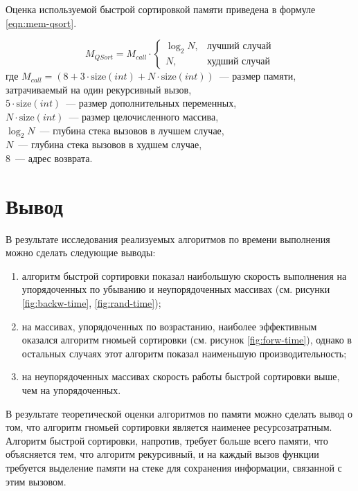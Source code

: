Оценка используемой быстрой сортировкой памяти приведена в формуле \ref{eqn:mem-qsort}.

\begin{equation}
    \label{eqn:mem-qsort}
    M_{QSort} = M_{call} \cdot
    \begin{cases}
        \log_2{N}, & \text{лучший случай} \\
        N, & \text{худший случай}
    \end{cases}
\end{equation}
где  $M_{call} = (8 + 3 \cdot \text{size}(int) + N \cdot \text{size}(int))$~--- размер памяти, затрачиваемый на один рекурсивный вызов,
\\ $5 \cdot \text{size}(int)$~--- размер дополнительных переменных,
\\ $N \cdot \text{size}(int)$~--- размер целочисленного массива,
\\ $\log_2{N}$~--- глубина стека вызовов в лучшем случае,
\\ $N$~--- глубина стека вызовов в худшем случае,
\\ $8$~--- адрес возврата.

\section{Вывод}


В результате исследования реализуемых алгоритмов по времени выполнения можно сделать следующие выводы:
\begin{enumerate}
    \item алгоритм быстрой сортировки показал наибольшую скорость выполнения на упорядоченных по убыванию и неупорядоченных массивах (см. рисунки \ref{fig:backw-time}, \ref{fig:rand-time});
    \item на массивах, упорядоченных по возрастанию, наиболее эффективным оказался алгоритм гномьей сортировки (см. рисунок \ref{fig:forw-time}), однако в остальных случаях этот алгоритм показал наименьшую производительность;
    \item на неупорядоченных массивах скорость работы быстрой сортировки выше, чем на упорядоченных.
\end{enumerate}

В результате теоретической оценки алгоритмов по памяти можно сделать вывод о том, что алгоритм гномьей сортировки является наименее ресурсозатратным.
Алгоритм быстрой сортировки, напротив, требует больше всего памяти, что объясняется тем, что алгоритм рекурсивный, и на каждый вызов функции требуется выделение памяти на стеке для сохранения информации, связанной с этим вызовом.